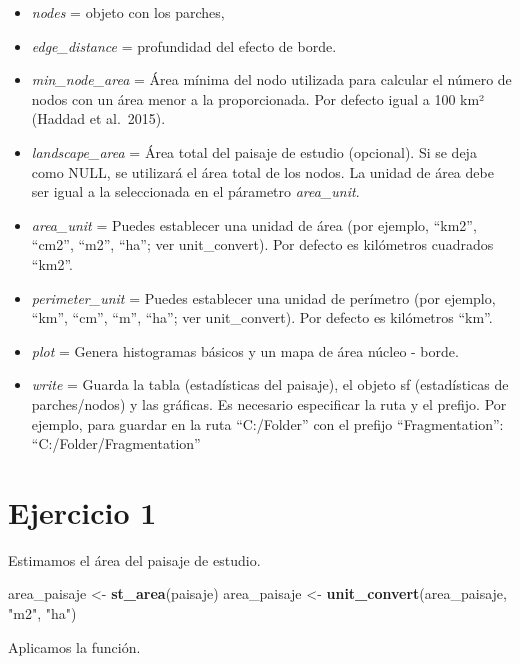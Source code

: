\documentclass[
]{book}
\newenvironment{Shaded}{\begin{snugshade}}{\end{snugshade}}
\newcommand{\FunctionTok}[1]{\textcolor[rgb]{0.13,0.29,0.53}{\textbf{#1}}}
\newcommand{\NormalTok}[1]{#1}
\newcommand{\OtherTok}[1]{\textcolor[rgb]{0.56,0.35,0.01}{#1}}
\newcommand{\StringTok}[1]{\textcolor[rgb]{0.31,0.60,0.02}{#1}}
\providecommand{\tightlist}{%
  \setlength{\itemsep}{0pt}\setlength{\parskip}{0pt}}
\begin{document}
\begin{itemize}
\tightlist
\item
  \emph{nodes} = objeto con los parches,
\item
  \emph{edge\_distance} = profundidad del efecto de borde.
\item
  \emph{min\_node\_area} = Área mínima del nodo utilizada para calcular el número de nodos con un área menor a la proporcionada. Por defecto igual a 100 km² (Haddad et al.~2015).
\item
  \emph{landscape\_area} = Área total del paisaje de estudio (opcional). Si se deja como NULL, se utilizará el área total de los nodos. La unidad de área debe ser igual a la seleccionada en el párametro \emph{area\_unit}.
\item
  \emph{area\_unit} = Puedes establecer una unidad de área (por ejemplo, ``km2'', ``cm2'', ``m2'', ``ha''; ver unit\_convert). Por defecto es kilómetros cuadrados ``km2''.
\item
  \emph{perimeter\_unit} = Puedes establecer una unidad de perímetro (por ejemplo, ``km'', ``cm'', ``m'', ``ha''; ver unit\_convert). Por defecto es kilómetros ``km''.
\item
  \emph{plot} = Genera histogramas básicos y un mapa de área núcleo - borde.
\item
  \emph{write} = Guarda la tabla (estadísticas del paisaje), el objeto sf (estadísticas de parches/nodos) y las gráficas. Es necesario especificar la ruta y el prefijo. Por ejemplo, para guardar en la ruta ``C:/Folder'' con el prefijo ``Fragmentation'': ``C:/Folder/Fragmentation''
\end{itemize}

\section{Ejercicio 1}\label{ejercicio-1}

Estimamos el área del paisaje de estudio.

\begin{Shaded}
\begin{Highlighting}[]
\NormalTok{area\_paisaje }\OtherTok{\textless{}{-}} \FunctionTok{st\_area}\NormalTok{(paisaje) }
\NormalTok{area\_paisaje }\OtherTok{\textless{}{-}} \FunctionTok{unit\_convert}\NormalTok{(area\_paisaje, }\StringTok{"m2"}\NormalTok{, }\StringTok{"ha"}\NormalTok{) }
\end{Highlighting}
\end{Shaded}

Aplicamos la función.
\end{document}
